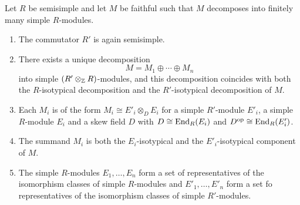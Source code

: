 \begin{theorem}
  Let $R$ be semisimple and let $M$ be faithful such that $M$ decomposes into finitely many simple $R$-modules.
  \begin{enumerate}
    \item
      The commutator $R'$ is again semisimple.
    \item
      There exists a unique decomposition
      \[
          M
        = M_1 \oplus \dotsb \oplus M_n
      \]
      into simple $(R' \otimes_{\mathbb{Z}} R)$-modules, and this decomposition coincides with both the $R$-isotypical decomposition and the $R'$-isotypical decomposition of $M$.
    \item
      Each $M_i$ is of the form $M_i \cong E'_i \otimes_D E_i$ for a simple $R'$-module $E'_i$, a simple $R$-module $E_i$ and a skew field $D$ with $D \cong \operatorname{End}_R(E_i)$ and $D^{\operatorname{op}} \cong \operatorname{End}_R(E'_i)$.
    \item
      The summand $M_i$ is both the $E_i$-isotypical and the $E'_i$-isotypical component of $M$.
    \item
      The simple $R$-modules $E_1, \dotsc, E_n$ form a set of representatives of the isomorphism classes of simple $R$-modules and $E'_1, \dotsc, E'_n$ form a set fo representatives of the isomorphism classes of simple $R'$-modules.
  \end{enumerate}
\end{theorem}



% 
% 
% 
% 
%   


